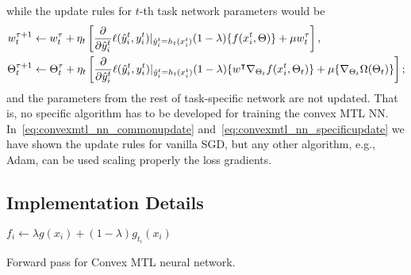 while the update rules for $t$-th task network parameters would be
\begin{equation}\label{eq:convexmtl_nn_specificupdate}
    \begin{aligned}
        w_t^{\tau + 1} &\gets w_t^\tau + \eta_t \left[  \frac{\partial}{\partial \hat{y}_i^t}  \lossf(\hat{y}_i^t, y_i^t) \vert_{\hat{y}_i^t = h_t(x_i^t)} (1 - \lambda) \lbrace f(x_i^t, \Theta) \rbrace + \mu w_t^\tau \right], \\
        \Theta_t^{\tau + 1} &\gets \Theta_t^\tau + \eta_t \left[ \frac{\partial}{\partial \hat{y}_i^t}  \lossf(\hat{y}_i^t, y_i^t) \vert_{\hat{y}_i^t = h_t(x_i^t)}  (1 - \lambda) \lbrace w^\intercal \nabla_{\Theta_t} f(x_i^t, \Theta_t)\rbrace + \mu \lbrace \nabla_{\Theta_t} \Omega( \Theta_t) \rbrace \right];
    \end{aligned}
\end{equation}
and the parameters from the rest of task-specific network are not updated.
%
That is, no specific algorithm has to be developed for training the convex MTL NN. In~\eqref{eq:convexmtl_nn_commonupdate} and~\eqref{eq:convexmtl_nn_specificupdate} we have shown the update rules for vanilla SGD, but any other algorithm, e.g., Adam, can be used scaling properly the loss gradients.





\subsection{Implementation Details}
\begin{algorithm}[!t]
    \DontPrintSemicolon
      
            { 
                $f_i \gets \lambda g(x_i) + (1 - \lambda) g_{t_i}(x_i)$   

            }
    \caption{Forward pass for Convex MTL neural network.}
    \label{alg:forward}
\end{algorithm}

